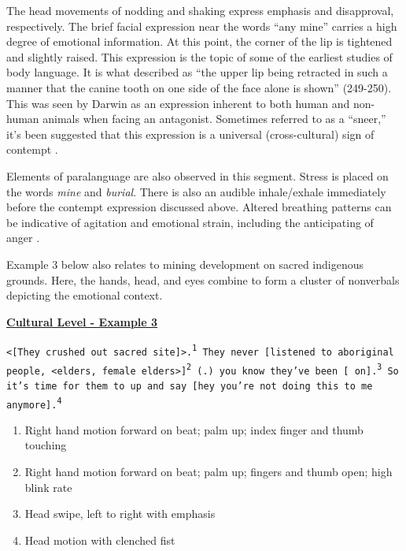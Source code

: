 The head movements of nodding and shaking express emphasis and disapproval, respectively. The brief facial expression near the words ``any mine'' carries a high degree of emotional information. At this point, the corner of the lip is tightened and slightly raised. This expression is the topic of some of the earliest studies of body language. It is what \cite*{Darwin1872} described as ``the upper lip being retracted in such a manner that the canine tooth on one side of the face alone is shown'' (249-250). This was seen by Darwin as an expression inherent to both human and non-human animals when facing an antagonist. Sometimes referred to as a ``sneer,'' it's been suggested that this expression is a universal (cross-cultural) sign of contempt \citep{Izard1988}.

Elements of paralanguage are also observed in this segment. Stress is placed on the words \textit{mine} and \textit{burial}. There is also an audible inhale/exhale immediately before the contempt expression discussed above.  Altered breathing patterns can be indicative of agitation and emotional strain, including the anticipating of anger \citep[118]{Poyatos2002a}.

Example 3 below also relates to mining development on sacred indigenous grounds. Here, the hands, head, and eyes combine to form a cluster of nonverbals depicting the emotional context.

\textbf{\underline{Cultural Level - Example 3}}

\begin{footnotesize}
\texttt{<[They crushed out sacred site]>.\textsuperscript{1} They never [listened to aboriginal people, <elders, female elders>]\textsuperscript{2} (.) you know they've been [ on].\textsuperscript{3} So it's time for them to  up and say [hey you're not doing this to me anymore].\textsuperscript{4}} 
\end{footnotesize}

\begin{footnotesize}
\begin{enumerate}
   \item Right hand motion forward on beat; palm up; index finger and thumb touching
   \item Right hand motion forward on beat; palm up; fingers and thumb open; high blink rate
   \item Head swipe, left to right with emphasis
   \item Head motion with clenched fist
\end{enumerate}
\end{footnotesize}

